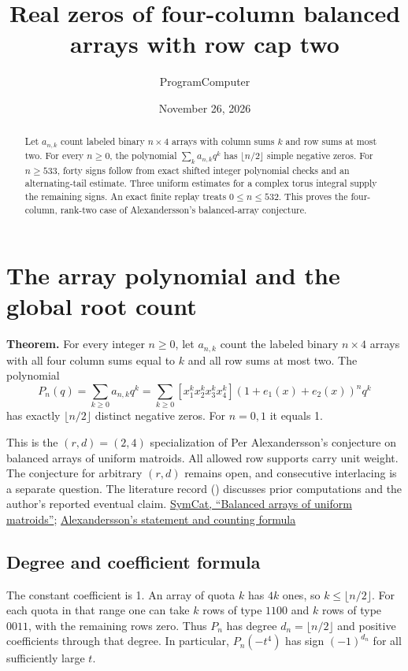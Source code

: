 \documentclass[11pt]{article}
\title{Real zeros of four-column balanced arrays with row cap two}
\author{ProgramComputer}
\date{November 26, 2026}
\begin{document}
\maketitle

\begin{abstract}
Let $a_{n,k}$ count labeled binary $n\times4$ arrays with column sums $k$
and row sums at most two. For every $n\ge0$, the polynomial
$\sum_k a_{n,k}q^k$ has $\lfloor n/2\rfloor$ simple negative zeros.
For $n\ge533$, forty signs follow from exact shifted integer polynomial
checks and an alternating-tail estimate. Three uniform estimates for a
complex torus integral supply the remaining signs. An exact finite
replay treats $0\le n\le532$. This proves the four-column, rank-two case
of Alexandersson's balanced-array conjecture.
\end{abstract}
\section{The array polynomial and the global root count}
\label{sec:proof}

\textbf{Theorem.} For every integer $n\ge0$, let $a_{n,k}$ count the labeled binary $n\times4$ arrays with all four column sums equal to $k$ and all row sums at most two. The polynomial
\[
P_n(q)=\sum_{k\ge0}a_{n,k}q^k
=\sum_{k\ge0}[x_1^k x_2^k x_3^k x_4^k](1+e_1(x)+e_2(x))^n q^k
\]
has exactly $\lfloor n/2\rfloor$ distinct negative zeros. For $n=0,1$ it equals 1.

This is the $(r,d)=(2,4)$ specialization of Per Alexandersson's conjecture on balanced arrays of uniform matroids. All allowed row supports carry unit weight. The conjecture for arbitrary $(r,d)$ remains open, and consecutive interlacing is a separate question. The literature record () discusses prior computations and the author's reported eventual claim. \href{https://www.symmetricfunctions.com/realRootedOpenProblems.htm\#conjBalancedArrays}{SymCat, ``Balanced arrays of uniform matroids''}; \href{https://github.com/PerAlexandersson/RealRooted/issues/2005}{Alexandersson's statement and counting formula}

\subsection{Degree and coefficient formula}
\label{sec:degree-and-coefficient-formula}

The constant coefficient is 1. An array of quota $k$ has $4k$ ones, so $k\le\lfloor n/2\rfloor$. For each quota in that range one can take $k$ rows of type $1100$ and $k$ rows of type $0011$, with the remaining rows zero. Thus $P_n$ has degree $d_n=\lfloor n/2\rfloor$ and positive coefficients through that degree. In particular, $P_n(-t^4)$ has sign $(-1)^{d_n}$ for all sufficiently large $t$.
\end{document}

